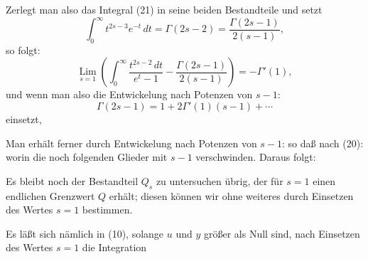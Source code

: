 
Zerlegt man also das Integral (21) in seine beiden Bestandteile und setzt
\[
\int_0^\infty t^{2s-3}e^{-t}\,dt = \Gamma(2s-2) = \frac{\Gamma(2s-1)}{2(s-1)},
\]
so folgt:
\[
\mathop{\mathrm{Lim}}\limits_{s=1}\left(\int_0^\infty \frac{t^{2s-2}\,dt}{e^t-1} - \frac{\Gamma(2s-1)}{2(s-1)}\right) = -\Gamma'(1),
\]
und wenn man also die Entwickelung nach Potenzen von $s-1$:
\[
\Gamma(2s-1) = 1 + 2\Gamma'(1)(s-1) + \cdots
\]
einsetzt,

Man erhält ferner durch Entwickelung nach Potenzen von $s-1$:
so daß nach (20):
worin die noch folgenden Glieder mit $s-1$ verschwinden. Daraus folgt:

Es bleibt noch der Bestandteil $Q_s$ zu untersuchen übrig, der für $s=1$ einen endlichen Grenzwert $Q$ erhält; diesen können wir ohne weiteres durch Einsetzen des Wertes $s=1$ bestimmen.

Es läßt sich nämlich in (10), solange $u$ und $y$ größer als Null sind, nach Einsetzen des Wertes $s=1$ die Integration
